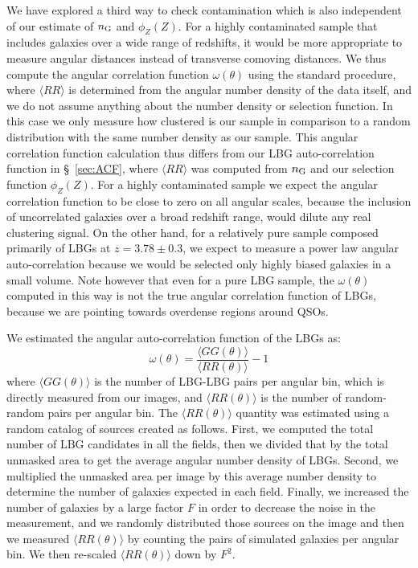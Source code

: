 \documentclass[iop, revtex4]{emulateapj}
\begin{document}
We have explored a third way to check contamination
which is also independent of our estimate of $n_{\rm G}$ and $\phi_{Z}(Z)$.
For a highly contaminated sample that includes galaxies over a wide range
of redshifts, it would be  more appropriate to measure angular distances instead of
transverse comoving distances.  We thus compute the angular correlation function $\omega(\theta)$ using the standard
procedure, where $\langle RR\rangle$ is determined from the angular number density of the
data itself, and we do not assume anything about the number density or selection function.
 In this case we only measure how clustered is our sample in comparison to a random distribution
  with the same number density as our sample. This angular correlation function calculation thus differs from our LBG
auto-correlation function in \S~\ref{sec:ACF}, where $\langle RR\rangle$ was
computed from $n_{\rm G}$ and our selection function $\phi_{Z}(Z)$.
For a highly contaminated sample we
expect the angular correlation function to be close to
zero on all angular scales, because the inclusion of uncorrelated
galaxies over a broad redshift range, would dilute
any real clustering signal.
On the other hand, for a relatively pure sample composed primarily of LBGs at $z=3.78\pm0.3$,  we
expect to measure a power law angular auto-correlation because we would be
selected only highly biased  galaxies in a small volume. Note however that
even for a pure LBG sample, the $\omega(\theta)$ computed in this way is not the true angular
correlation function of LBGs, because we are pointing towards overdense regions around QSOs.

We estimated the angular auto-correlation function of the LBGs as:
\begin{equation}
\omega (\theta) = \frac{\langle GG (\theta)\rangle}{\langle RR (\theta)\rangle} - 1
\end{equation}
where $\langle GG (\theta)\rangle$ is the number of LBG-LBG pairs per
angular bin, which is directly measured from our images, and $\langle
RR(\theta)\rangle$ is the number of random-random pairs per angular
bin.
The $\langle RR (\theta)\rangle$ quantity was estimated using a
random catalog of sources created as follows. First, we computed the
total number of LBG candidates in all the fields, then we divided
that by the total unmasked area to get the average angular number density of LBGs. 
Second, we multiplied the unmasked area per image by this
average number density to determine the number of galaxies expected in
each field. Finally, we increased the number of galaxies by a large
factor $F$ in order to decrease the noise in the measurement, and we
randomly distributed those sources on the image and then we measured
$\langle RR (\theta)\rangle$ by counting the pairs of simulated
galaxies per angular bin. We then re-scaled $\langle RR
(\theta)\rangle$ down by $F^{2}$.
\end{document}
